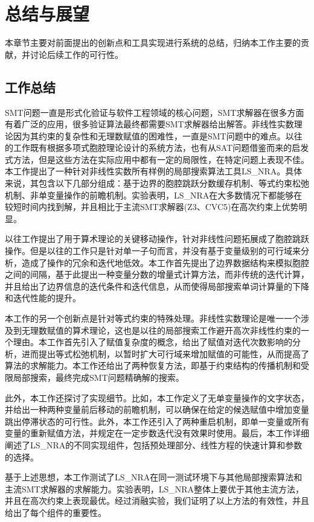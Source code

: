 \chapter{总结与展望}\label{chap:conclusion}

本章节主要对前面提出的创新点和工具实现进行系统的总结，归纳本工作主要的贡献，并讨论后续工作的可行性。

\section{工作总结}
SMT问题一直是形式化验证与软件工程领域的核心问题，SMT求解器在很多方面有着广泛的应用，很多验证算法最终都需要SMT求解器给出解答。非线性实数理论因为其约束的复杂性和无理数赋值的困难性，一直是SMT问题中的难点。以往的工作既有根据多项式胞腔理论设计的系统方法，也有从SAT问题借鉴而来的启发式方法，但是这些方法在实际应用中都有一定的局限性，在特定问题上表现不佳。本工作提出了一种针对非线性实数所有样例的局部搜索算法工具LS\_NRA。具体来说，其包含以下几部分组成：基于边界的胞腔跳跃分数缓存机制、等式约束松弛机制、非单变量操作的前瞻机制。实验表明，LS\_NRA在大多数情况下都能够在较短时间内找到解，并且相比于主流SMT求解器(Z3、CVC5)在高次约束上优势明显。

以往工作提出了用于算术理论的关键移动操作，针对非线性问题拓展成了胞腔跳跃操作。但是以往的工作只是针对单一子句而言，并没有基于变量级别的可行域来分析，造成了操作的冗余和迭代地低效。本工作首先提出了边界数据结构来模拟胞腔之间的间隔，基于此提出一种变量分数的增量式计算方法，而非传统的迭代计算，并且给出了边界信息的迭代条件和迭代信息，从而使得局部搜索单词计算量的下降和迭代性能的提升。

本工作的另一个创新点是针对等式约束的特殊处理。非线性实数理论是唯一一个涉及到无理数赋值的算术理论，这也是以往的局部搜索工作避开高次非线性约束的一个理由。本工作首先引入了赋值复杂度的概念，给出了赋值对迭代次数影响的分析，进而提出等式松弛机制，以暂时扩大可行域来增加赋值的可能性，从而提高了算法的求解能力。本工作还给出了两种恢复方法，即基于约束结构的传播机制和受限局部搜索，最终完成SMT问题精确解的搜索。

此外，本工作还探讨了实现细节。比如，本工作定义了无单变量操作的文字状态，并给出一种两种变量前后移动的前瞻机制，可以确保在给定的候选赋值中增加变量跳出停滞状态的可行性。此外，本工作还引入了两种重启机制，即单一变量或所有变量的重新赋值方法，并规定在一定步数迭代没有效果时使用。最后，本工作详细阐述了LS\_NRA的不同实现组件，包括预处理部分、线性方程的快速计算和参数的选择。

基于上述思想，本工作测试了LS\_NRA在同一测试环境下与其他局部搜索算法和主流SMT求解器的求解能力。实验表明，LS\_NRA整体上要优于其他主流方法，并且在高次约束上表现最优。经过消融实验，我们证明了以上方法的有效性，并且给出了每个组件的重要性。

